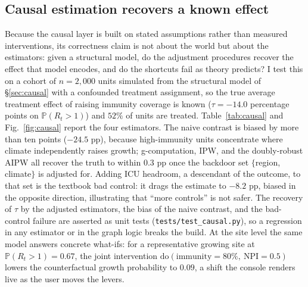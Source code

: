 \documentclass[10pt,twocolumn]{article}
\theoremstyle{definition}
\newcommand{\Rt}{R_t}
\newcommand{\Prob}{\mathbb{P}}
\newcommand{\code}[1]{\texttt{\small #1}}
\begin{document}
\subsection{Causal estimation recovers a known effect}
\label{sec:res-causal}
Because the causal layer is built on stated assumptions rather than measured
interventions, its correctness claim is not about the world but about the
estimators: given a structural model, do the adjustment procedures recover the
effect that model encodes, and do the shortcuts fail as theory predicts? I test
this on a cohort of $n=2{,}000$ units simulated from the structural model of
\S\ref{sec:causal} with a confounded treatment assignment, so the true average
treatment effect of raising immunity coverage is known ($\tau=-14.0$ percentage
points on $\Prob(\Rt>1)$) and $52\%$ of units are treated. Table~\ref{tab:causal}
and Fig.~\ref{fig:causal} report the four estimators. The naive contrast is
biased by more than ten points ($-24.5$ pp), because high-immunity units
concentrate where climate independently raises growth; g-computation, IPW, and
the doubly-robust AIPW all recover the truth to within $0.3$ pp once the backdoor
set $\{$region, climate$\}$ is adjusted for. Adding ICU headroom, a descendant of
the outcome, to that set is the textbook bad control: it drags the estimate to
$-8.2$ pp, biased in the opposite direction, illustrating that ``more controls''
is not safer. The recovery of $\tau$ by the adjusted estimators, the bias of the
naive contrast, and the bad-control failure are asserted as unit tests
(\code{tests/test\_causal.py}), so a regression in any estimator or in the graph
logic breaks the build. At the site level the same model answers concrete
what-ifs: for a representative growing site at $\Prob(\Rt>1)=0.67$, the joint
intervention $\mathrm{do}(\text{immunity}{=}80\%,\ \text{NPI}{=}0.5)$ lowers the
counterfactual growth probability to $0.09$, a shift the console renders live as
the user moves the levers.
\end{document}
